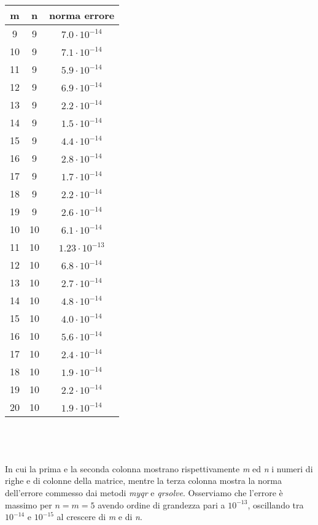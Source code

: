 \documentclass[a4paper]{report}
\begin{document}
\begin{tabular}{|c|c|c|}
	\hline
	m&n&norma errore\\ \hline
     9& 9&$7.0\cdot 10^{-14}$\\ \hline
10& 9&$7.1\cdot 10^{-14}$\\ \hline
11& 9&$5.9\cdot 10^{-14}$\\ \hline
12& 9&$6.9\cdot 10^{-14}$\\ \hline
13& 9&$2.2\cdot 10^{-14}$\\ \hline
14& 9&$1.5\cdot 10^{-14}$\\ \hline
15& 9&$4.4\cdot 10^{-14}$\\ \hline
16& 9&$2.8\cdot 10^{-14}$\\ \hline
17& 9&$1.7\cdot 10^{-14}$\\ \hline
18& 9&$2.2\cdot 10^{-14}$\\ \hline
19& 9&$2.6\cdot 10^{-14}$\\ \hline
10&10&$6.1\cdot 10^{-14}$\\ \hline
11&10&$1.23\cdot 10^{-13}$\\ \hline
12&10&$6.8\cdot 10^{-14}$\\ \hline
13&10&$2.7\cdot 10^{-14}$\\ \hline
14&10&$4.8\cdot 10^{-14}$\\ \hline
15&10&$4.0\cdot 10^{-14}$\\ \hline
16&10&$5.6\cdot 10^{-14}$\\ \hline
17&10&$2.4\cdot 10^{-14}$\\ \hline
18&10&$1.9\cdot 10^{-14}$\\ \hline
19&10&$2.2\cdot 10^{-14}$\\ \hline
20&10&$1.9\cdot 10^{-14}$\\ \hline
\end{tabular}
\\\\ \\ In cui la prima e la seconda colonna mostrano rispettivamente \emph{m} ed \emph{n} i numeri di righe e di colonne della matrice, mentre la terza colonna mostra la norma dell'errore commesso dai metodi \emph{myqr} e \emph{qrsolve}.
Osserviamo che l'errore è massimo per $n = m = 5$ avendo ordine di grandezza pari a $10^{-13}$, oscillando tra $10^{-14}$ e $10^{-15}$ al crescere di \emph{m} e di \emph{n}.
\newpage
\end{document}
